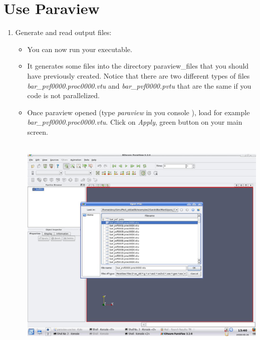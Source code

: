 \section{Use Paraview}
	\begin{enumerate}
	\item{Generate and read output files:}
		\begin{itemize}
		\item You can now run your executable. 
		\item It generates some files into the directory paraview\_files that you should have previously created. Notice that there are two different types of files \emph{bar\_pvf0000.proc0000.vtu} and \emph{bar\_pvf0000.pvtu} that are the same if you code is not parallelized. 
		\item Once paraview opened (type \emph{paraview} in you console ), load for example \emph{bar\_pvf0000.proc0000.vtu}. Click on \emph{Apply}, green button on your main screen.\\\\
		\begin{center}
		\includegraphics{snap1.eps}\\
		\vspace{0.5cm} 

\end{center}
\end{itemize}
\end{enumerate}
